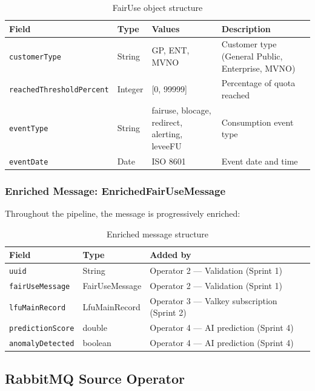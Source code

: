 \begin{table}[H]
    \centering
    \caption{FairUse object structure}
    \label{tab:fairuse}
    \begin{tabularx}{\textwidth}{l l l X}
\toprule
\textbf{Field} & \textbf{Type} & \textbf{Values} & \textbf{Description} \\
\midrule
\texttt{customerType} & String & GP, ENT, MVNO & Customer type (General Public, Enterprise, MVNO) \\
\texttt{reachedThresholdPercent} & Integer & [0, 99999] & Percentage of quota reached \\
\texttt{eventType} & String & fairuse, blocage, redirect, alerting, leveeFU & Consumption event type \\
\texttt{eventDate} & Date & ISO 8601 & Event date and time \\
\bottomrule
    \end{tabularx}
\end{table}

\subsubsection{Enriched Message: EnrichedFairUseMessage}

Throughout the pipeline, the message is progressively enriched:

\begin{table}[H]
    \centering
    \caption{Enriched message structure}
    \label{tab:enriched}
    \begin{tabularx}{\textwidth}{l l X}
\toprule
\textbf{Field} & \textbf{Type} & \textbf{Added by} \\
\midrule
\texttt{uuid} & String & Operator 2 --- Validation (Sprint 1) \\
\texttt{fairUseMessage} & FairUseMessage & Operator 2 --- Validation (Sprint 1) \\
\texttt{lfuMainRecord} & LfuMainRecord & Operator 3 --- Valkey subscription (Sprint 2) \\
\texttt{predictionScore} & double & Operator 4 --- AI prediction (Sprint 4) \\
\texttt{anomalyDetected} & boolean & Operator 4 --- AI prediction (Sprint 4) \\
\bottomrule
    \end{tabularx}
\end{table}

\subsection{RabbitMQ Source Operator}

